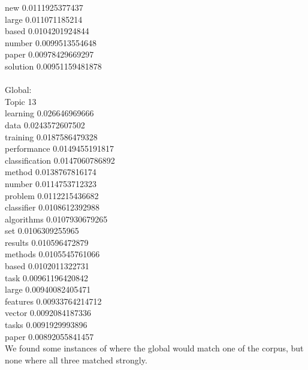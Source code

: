 \documentclass{article}
\begin{document}
new 0.0111925377437\\
large 0.011071185214\\
based 0.0104201924844\\
number 0.0099513554648\\
paper 0.00978429669297\\
solution 0.00951159481878\\
\\
Global:\\
Topic 13\\
learning 0.026646969666\\
data 0.0243572607502\\
training 0.0187586479328\\
performance 0.0149455191817\\
classification 0.0147060786892\\
method 0.0138767816174\\
number 0.0114753712323\\
problem 0.0112215436682\\
classifier 0.0108612392988\\
algorithms 0.0107930679265\\
set 0.0106309255965\\
results 0.010596472879\\
methods 0.0105545761066\\
based 0.0102011322731\\
task 0.00961196420842\\
large 0.00940082405471\\
features 0.00933764214712\\
vector 0.0092084187336\\
tasks 0.0091929993896\\
paper 0.00892055841457\\

We found some instances of where the global would match one of the corpus, but none where all three matched strongly.
\end{document}
